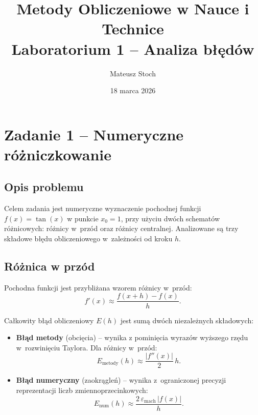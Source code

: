 \documentclass[12pt, a4paper]{article}
\title{
  \textbf{Metody Obliczeniowe w Nauce i Technice} \\[0.5em]
  \large Laboratorium 1 -- Analiza błędów
}
\author{Mateusz Stoch}
\date{18 marca 2026}
\begin{document}
\maketitle
\tableofcontents
\newpage

\section{Zadanie 1 -- Numeryczne różniczkowanie}

\subsection{Opis problemu}

Celem zadania jest numeryczne wyznaczenie pochodnej funkcji $f(x) = \tan(x)$ w punkcie $x_0 = 1$, przy użyciu dwóch schematów różnicowych: różnicy w~przód oraz różnicy centralnej. Analizowane są trzy składowe błędu obliczeniowego w~zależności od kroku $h$.

\subsection{Różnica w przód}

Pochodna funkcji jest przybliżana wzorem różnicy w~przód:
\begin{equation}
  f'(x) \approx \frac{f(x+h) - f(x)}{h}.
  \label{eq:forward}
\end{equation}

Całkowity błąd obliczeniowy $E(h)$ jest sumą dwóch niezależnych składowych:
\begin{itemize}
  \item \textbf{Błąd metody} (obcięcia) -- wynika z pominięcia wyrazów wyższego rzędu w~rozwinięciu Taylora. Dla różnicy w~przód:
    \begin{equation}
      E_{\text{metody}}(h) \approx \frac{|f''(x)|}{2}\, h.
      \label{eq:err_method_fwd}
    \end{equation}
  \item \textbf{Błąd numeryczny} (zaokrągleń) -- wynika z~ograniczonej precyzji reprezentacji liczb zmiennoprzecinkowych:
    \begin{equation}
      E_{\text{num}}(h) \approx \frac{2\,\varepsilon_{\text{mach}}\,|f(x)|}{h}.
      \label{eq:err_num_fwd}
    \end{equation}
\end{itemize}
\end{document}
